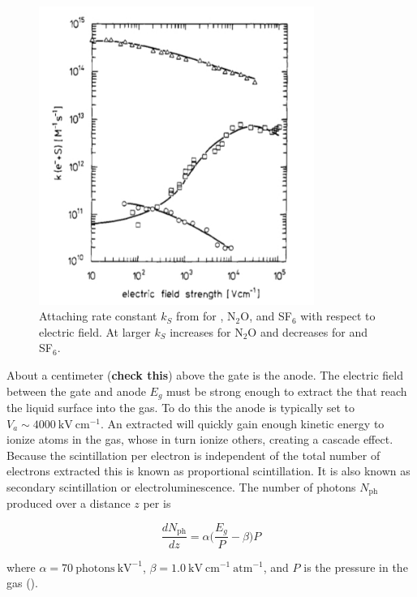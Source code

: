 \begin{figure}
\includegraphics[width=0.8\textwidth]{AttachmentRate}
\caption{Attaching rate constant $k_{S}$ from  for \otwo, N$_{2}$O, and SF$_{6}$ with respect to electric field.  At
larger \efield $k_{S}$ increases for N$_{2}$O and decreases for \otwo and SF$_{6}$.}
\label{fig:attachment_rate}
\end{figure}

About a centimeter (\textbf{check this}) above the gate is the anode.  The electric field between the gate and anode $E_{g}$ must be strong
enough to extract the \electron that reach the liquid surface into the gas.  To do this the anode is typically set to
$V_{a} \sim 4000\ \mathrm{kV\ cm^{-1}}$.  An extracted \electron will quickly gain enough kinetic energy to ionize atoms in the gas,
whose \electron in turn ionize others, creating a cascade effect.  Because the scintillation per electron is independent of
the total number of electrons extracted this is known as proportional scintillation.  It is also known as secondary scintillation or
electroluminescence.  The number of photons $N_{\mathrm{ph}}$ produced over a distance $z$ per \electron is

\begin{equation}
\frac{dN_{\mathrm{ph}}}{dz} = \alpha \Big( \frac{E_{g}}{P} - \beta \Big) P
\label{eq:electronlum}
\end{equation}

\noindent where $\alpha = 70\ \mathrm{photons\ kV^{-1}}$, $\beta = 1.0\ \mathrm{kV\ cm^{-1}\ atm^{-1}}$, and $P$ is the pressure in the
gas ().

